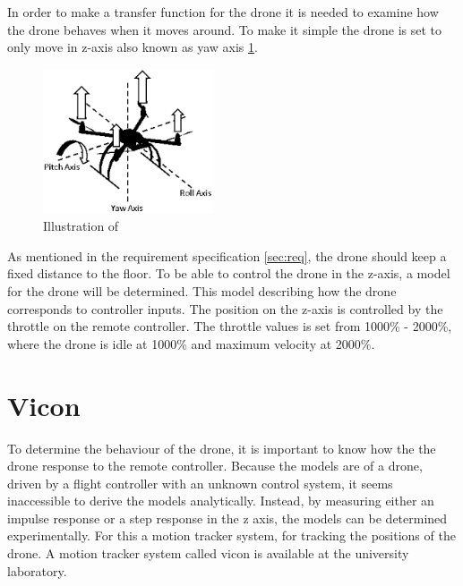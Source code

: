 In order to make a transfer function for the drone it is needed to examine how the drone behaves when it moves around. To make it simple the drone is set to only move in z-axis also known as yaw axis \ref{fig:z_axis}.
\begin{figure}[H]
    \centering
    \includegraphics[width=0.45\textwidth]{figures/ch_movement/z-axis.png}
    \caption{Illustration of \cite{drone_axis}}
    \label{fig:z_axis}
\end{figure}


 As mentioned in the requirement specification \ref{sec:req}, the drone should keep a fixed distance to the floor. To be able to control the drone in the z-axis, a model for the drone will be determined. This model describing how the drone corresponds to controller inputs. The position on the z-axis is controlled by the throttle on the remote controller. The throttle values is set from 1000\% - 2000\%, where the drone is idle at 1000\% and maximum velocity at 2000\%.  

\section{Vicon}\label{s:vicon}
To determine the behaviour of the drone, it is important to know how the the drone response to the remote controller. 
Because the models are of a drone, driven by a flight controller with an unknown control system, it seems inaccessible to derive the models analytically. Instead, by measuring either an impulse response or a step
response in the z axis, the models can be determined experimentally. For this a motion tracker system, for tracking the positions of the drone. A motion tracker system called vicon is available at the university laboratory. 

